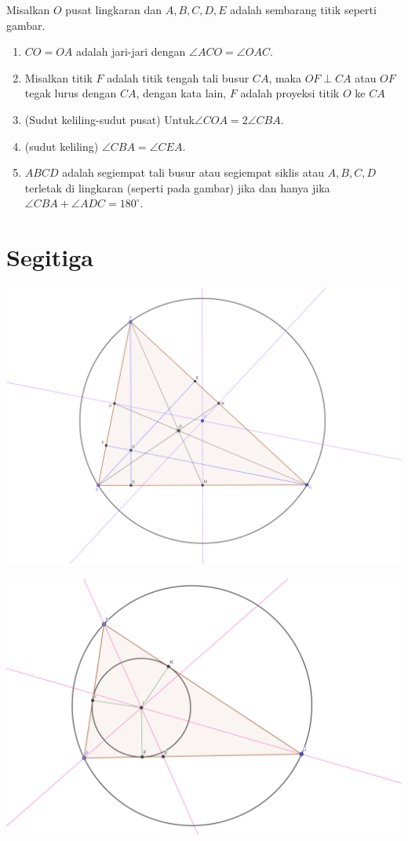 \documentclass[11pt]{scrartcl}
\begin{document}
Misalkan $O$ pusat lingkaran dan $A,B,C,D,E$ adalah sembarang titik seperti gambar.
\begin{enumerate}
    \item $CO=OA$ adalah jari-jari dengan $\angle ACO = \angle OAC$.
    \item Misalkan titik $F$ adalah titik tengah tali busur $CA$, maka $OF \perp CA$ atau $OF$ tegak lurus dengan $CA$, dengan kata lain, $F$ adalah proyeksi titik $O$ ke $CA$
    \item (Sudut keliling-sudut pusat) Untuk$\angle COA = 2\angle CBA$.
    \item (sudut keliling) $\angle CBA = \angle CEA$.
    \item $ABCD$ adalah segiempat tali busur atau segiempat siklis  atau $A,B,C,D$ terletak di lingkaran (seperti pada gambar) jika dan hanya jika $\angle CBA + \angle ADC = 180^\circ$.
\end{enumerate}

\section{Segitiga}
\begin{center}
	\includegraphics[scale=1.2]{geogebra-one-1.png}
	\end{center}
	\begin{center}
		\includegraphics[scale=0.9]{geogebra-one-2.png}
		\end{center}
\end{document}
